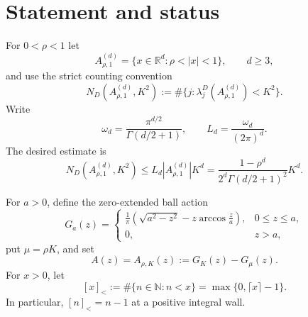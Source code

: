 \documentclass[11pt]{article}
\theoremstyle{remark}
\newcommand{\R}{\mathbb R}
\newcommand{\N}{\mathbb N}
\newcommand{\sbr}[1]{[#1]_{<}}
\begin{document}
\begin{abstract}
 $\rho\geq1847/2000$.  Retaining instead the exact correlated negative
 prefix, sharpening the active width, and improving the small-level
 distance extends the exclusion to $\rho\geq23/25$.
 Combined with the fixed-ratio scalar estimate, this reduces every
 residual high-floor candidate to
 \[
  \frac1{3154914}<\rho<\frac{23}{25},\qquad
  \frac{21}{4}<K<1577457.
 \]
 This is a sharper compact reduction, not a proof of the residual
 fixed-ratio walls.  A directed-rounding
 certificate proves all $19602$ finite first-floor chambers with
 $r\geq3/2$, $s\in\{0,1\}$, $x<100$.  A second certificate handles all
 $398$ finite small-start chambers, while an analytic comparison closes
 their infinite rays.  Together with the continuous large-ray certificate,
 this proves the entire first-floor first-drop sector $s\in\{0,1\}$.  A scale-free
 true-interface argument, completed by a directed-rounding moving-boundary
 certificate, proves the complementary cone $s\geq2$ throughout
 $K-\mu\geq\pi$.  Combined with the no-mode theorem below the active wall,
 this closes the whole ordinary first-floor first-drop branch needed for the
 spectral theorem.  In the no-drop branch, directed-rounding certificates
 now prove the reduced scalar strictly positive on every floor $f\geq2$:
 the two low-floor rows use $2268$ phase chambers, and an eight-shard
 certificate covers every $f\geq4$ residual.  The zero floor is automatic.
 The first-floor no-drop case $f=1$, $p=n$, and the residual high-floor
 first-drop compact walls remain uncertified; no assertion in this
 manuscript treats the full residual terminal-shelf scalar as proved.
\end{abstract}

\section{Statement and status}

For $0<\rho<1$ let
\[
 A_{\rho,1}^{(d)}=\{x\in\R^d:\rho<|x|<1\},
 \qquad d\geq3,
\]
and use the strict counting convention
\[
 N_D(A_{\rho,1}^{(d)},K^2)
 :=\#\{j:\lambda_j^D(A_{\rho,1}^{(d)})<K^2\}.
\]
Write
\[
 \omega_d=\frac{\pi^{d/2}}{\Gamma(d/2+1)},
 \qquad L_d=\frac{\omega_d}{(2\pi)^d}.
\]
The desired estimate is
\begin{equation}
 N_D(A_{\rho,1}^{(d)},K^2)
 \leq L_d|A_{\rho,1}^{(d)}|K^d
 =\frac{1-\rho^d}{2^d\Gamma(d/2+1)^2}K^d.
 \label{eq:polya-target}
\end{equation}

For $a>0$, define the zero-extended ball action
\begin{equation}
 G_a(z)=
 \begin{cases}
 \displaystyle\frac1\pi\left(\sqrt{a^2-z^2}
 -z\arccos\frac za\right),&0\leq z\leq a,\\[1mm]
 0,&z>a,
 \end{cases}
 \label{eq:ball-action}
\end{equation}
put $\mu=\rho K$, and set
\begin{equation}
 A(z)=A_{\rho,K}(z):=G_K(z)-G_\mu(z).
 \label{eq:shell-action}
\end{equation}
For $x>0$, let
\[
 \sbr{x}:=\#\{n\in\N:n<x\}=\max\{0,\lceil x\rceil-1\}.
\]
In particular, $\sbr{n}=n-1$ at a positive integral wall.
\end{document}
